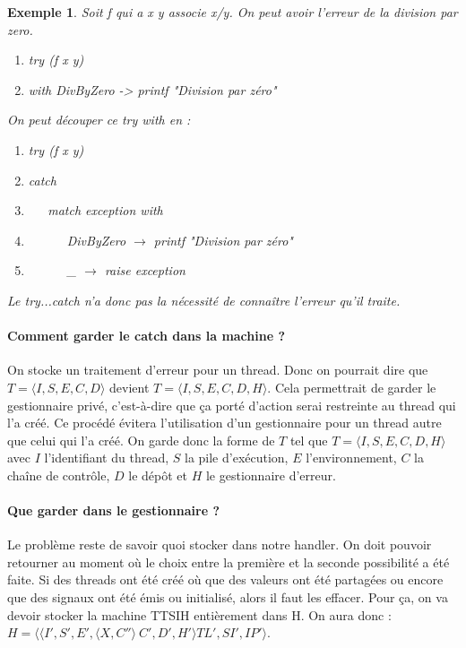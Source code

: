 \documentclass[10pt,a4paper]{report}
\newtheorem{ex}{Exemple}
\begin{document}
	\begin{ex}
		Soit f qui a x y associe x/y. On peut avoir l'erreur de la division par zero.
		\smallbreak
		\begin{enumerate}
			\item try (f x y)
			\item with DivByZero -> printf "Division par zéro"
		\end{enumerate}
		\medbreak
		
		
		On peut découper ce try with en :
		\smallbreak
		\begin{enumerate}
			\item try (f x y)
			\item catch
			\item ~~~match exception with 
			\item ~~~~~~DivByZero $\rightarrow$ printf "Division par zéro"
			\item ~~~~~~\_ $\rightarrow$ raise exception
		\end{enumerate}
		\medbreak
		
		Le try...catch n'a donc pas la nécessité de connaître l'erreur qu'il traite.
	\end{ex}
	
	\medbreak
	
	\paragraph{Comment garder le catch dans la machine ?} 
	On stocke un traitement d'erreur pour un thread. Donc on pourrait dire que $T = \langle I,S,E,C,D\rangle$ devient $T = \langle I,S,E,C,D,H\rangle$. Cela permettrait de garder le gestionnaire privé, c'est-à-dire que ça porté d'action serai restreinte au thread qui l'a créé. Ce procédé évitera l'utilisation d'un gestionnaire pour un thread autre que celui qui l'a créé. On garde donc la forme de $T$ tel que $T = \langle I,S,E,C,D,H \rangle$ avec $I$ l'identifiant du thread, $S$ la pile d'exécution, $E$ l'environnement, $C$ la chaîne de contrôle, $D$ le dépôt et $H$ le gestionnaire d'erreur.
	
	\paragraph{Que garder dans le gestionnaire ?} 
	Le problème reste de savoir quoi stocker dans notre handler. On doit pouvoir retourner au moment où le choix entre la première et la seconde possibilité a été faite. Si des threads ont été créé où que des valeurs ont été partagées ou encore que des signaux ont été émis ou initialisé, alors il faut les effacer. Pour ça, on va devoir stocker la machine TTSIH entièrement dans H.
	\smallbreak
	On aura donc : $H = \langle\langle I',S',E',\langle X,C''\rangle~C',D',H'\rangle TL',SI',IP'\rangle$. 
	
\end{document}
